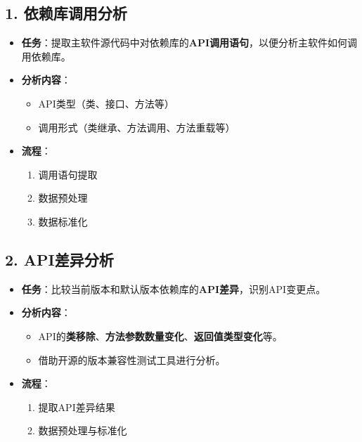 \documentclass[14pt,a4paper,UTF8,twoside]{article}
\begin{document}
\begin{multicols}{3} %

    \subsection*{1. 依赖库调用分析}
    \begin{itemize}
        \item \textbf{任务}：提取主软件源代码中对依赖库的\textbf{API调用语句}，以便分析主软件如何调用依赖库。
        \item \textbf{分析内容}：
        \begin{itemize}
            \item API类型（类、接口、方法等）
            \item 调用形式（类继承、方法调用、方法重载等）
        \end{itemize}
        \item \textbf{流程}：
        \begin{enumerate}
            \item 调用语句提取
            \item 数据预处理
            \item 数据标准化
        \end{enumerate}
    \end{itemize}
    
    \columnbreak %
    
    \subsection*{2. API差异分析}
    \begin{itemize}
        \item \textbf{任务}：比较当前版本和默认版本依赖库的\textbf{API差异}，识别API变更点。
        \item \textbf{分析内容}：
        \begin{itemize}
            \item API的\textbf{类移除}、\textbf{方法参数数量变化}、\textbf{返回值类型变化}等。
            \item 借助开源的版本兼容性测试工具进行分析。
        \end{itemize}
        \item \textbf{流程}：
        \begin{enumerate}
            \item 提取API差异结果
            \item 数据预处理与标准化
        \end{enumerate}
    \end{itemize}
    

\end{multicols}
\end{document}
